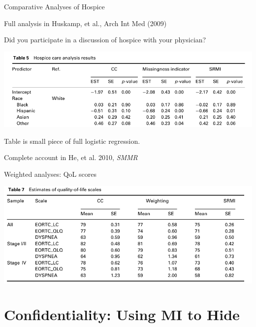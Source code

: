 \documentclass[11pt,handout]{beamer}
\begin{document}
\begin{frame}{Comparative Analyses of Hospice}
	
	Full analysis in Huskamp, et al., Arch Int Med (2009)
	
	Did you participate in a discussion of hospice with your physician?
	
	\begin{center}
	\includegraphics[width= 1.0\textwidth]{./figures/table_5.pdf}
	\end{center}

	Table is small piece of full logistic regression.
	
	Complete account in He, et al. 2010, \textsl{SMMR}
	
\end{frame}


\begin{frame}{Weighted analyses: QoL scores}
	
	\begin{center}
	\includegraphics[width= 1.0\textwidth]{./figures/qol_diagnostic.pdf}
	\end{center}
	
	
\end{frame}




\section{Confidentiality: Using MI to Hide}
\end{document}
